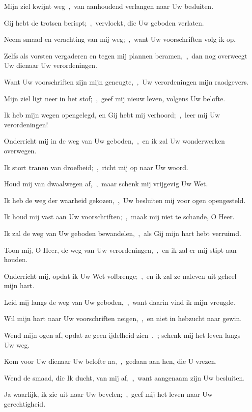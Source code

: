 \documentclass[12pt,twoside,a5paper]{article}
\begin{document}
\begin{halfparskip}
  Mijn ziel kwijnt weg~\sep\ van aanhoudend verlangen naar Uw besluiten.

  Gij hebt de trotsen berispt;~\sep\ vervloekt, die Uw geboden verlaten.

  Neem smaad en verachting van mij weg;~\sep\ want Uw voorschriften volg ik op.

  Zelfs als vorsten vergaderen en tegen mij plannen beramen,~\sep\ dan nog overweegt Uw dienaar Uw verordeningen.

  Want Uw voorschriften zijn mijn geneugte,~\sep\ Uw verordeningen mijn raadgevers.

   Mijn ziel ligt neer in het stof;~\sep\ geef mij nieuw leven, volgens Uw belofte.

  Ik heb mijn wegen opengelegd, en Gij hebt mij verhoord;~\sep\ leer mij Uw verordeningen!

  Onderricht mij in de weg van Uw geboden,~\sep\ en ik zal Uw wonderwerken overwegen.

  Ik stort tranen van droefheid;~\sep\ richt mij op naar Uw woord.

  Houd mij van dwaalwegen af,~\sep\ maar schenk mij vrijgevig Uw Wet.

  Ik heb de weg der waarheid gekozen,~\sep\ Uw besluiten mij voor ogen opengesteld.

  Ik houd mij vast aan Uw voorschriften;~\sep\ maak mij niet te schande, O Heer.

  Ik zal de weg van Uw geboden bewandelen,~\sep\ als Gij mijn hart hebt verruimd.

   Toon mij, O Heer, de weg van Uw verordeningen,~\sep\ en ik zal er mij stipt aan houden.

  Onderricht mij, opdat ik Uw Wet volbrenge;~\sep\ en ik zal ze naleven uit geheel mijn hart.

  Leid mij langs de weg van Uw geboden,~\sep\ want daarin vind ik mijn vreugde.

  Wil mijn hart naar Uw voorschriften neigen,~\sep\ en niet in hebzucht naar gewin.

  Wend mijn ogen af, opdat ze geen ijdelheid zien~\sep\ ; schenk mij het leven langs Uw weg.

  Kom voor Uw dienaar Uw belofte na,~\sep\ gedaan aan hen, die U vrezen.

  Wend de smaad, die Ik ducht, van mij af,~\sep\ want aangenaam zijn Uw besluiten.

  Ja waarlijk, ik zie uit naar Uw bevelen;~\sep\ geef mij het leven naar Uw gerechtigheid.


\end{halfparskip}
\end{document}
